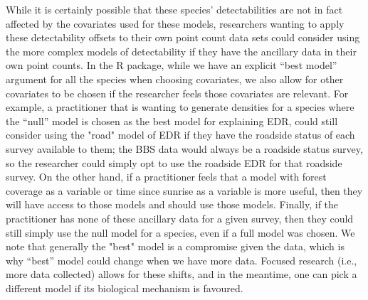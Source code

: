 \par While it is certainly possible that these species’ detectabilities are not in fact affected by the covariates used for these models, researchers wanting to apply these detectability offsets to their own point count data sets could consider using the more complex models of detectability if they have the ancillary data in their own point counts. In the  R package, while we have an explicit “best model” argument for all the species when choosing covariates, we also allow for other covariates to be chosen if the researcher feels those covariates are relevant. For example, a practitioner that is wanting to generate densities for a species where the “null” model is chosen as the best model for explaining EDR, could still consider using the "road" model of EDR if they have the roadside status of each survey available to them; the BBS data would always be a roadside status survey, so the researcher could simply opt to use the roadside EDR for that roadside survey. On the other hand, if a practitioner feels that a model with forest coverage as a variable or time since sunrise as a variable is more useful, then they will have access to those models and should use those models. Finally, if the practitioner has none of these ancillary data for a given survey, then they could still simply use the null model for a species, even if a full model was chosen. We note that generally the "best" model is a compromise given the data, which is why “best” model could change when we have more data. Focused research (i.e., more data collected) allows for these shifts, and in the meantime, one can pick a different model if its biological mechanism is favoured. 

